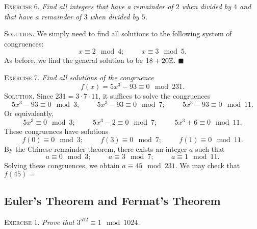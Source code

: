 \documentclass[11pt, leqno]{article}
\newcommand{\done}{\ensuremath{\blacksquare}}
\begin{document}
\textsc{Exercise 6}. \emph{Find all integers that have a remainder of $2$ when divided by $4$ and that have a remainder of $3$ when divided by $5$.}

\textsc{Solution}. We simply need to find all solutions to the following system of congruences: 
\begin{displaymath}
x\equiv 2 \mod 4; \hspace{1cm} x\equiv 3 \mod 5.
\end{displaymath}
As before, we find the general solution to be $18+20\mathbb{Z}$. \done

\textsc{Exercise 7}. \emph{Find all solutions of the congruence 
\begin{displaymath}
f(x) = 5x^3-93 \equiv 0 \mod 231.
\end{displaymath}}\textsc{Solution}. Since $231 = 3\cdot 7\cdot 11$, it suffices to solve the congruences 
\begin{displaymath}
5x^3-93 \equiv 0 \mod 3; \hspace{1cm} 5x^3-93 \equiv 0 \mod 7; \hspace{1cm} 5x^3-93 \equiv 0 \mod 11.
\end{displaymath}Or equivalently,
\begin{displaymath}
5x^3\equiv 0 \mod 3; \hspace{1cm} 5x^3-2\equiv 0 \mod 7; \hspace{1cm} 5x^3+6 \equiv 0 \mod 11.
\end{displaymath}
These congruences have solutions 
\begin{displaymath}
f(0) \equiv 0 \mod 3; \hspace{1cm} f(3) \equiv 0 \mod 7; \hspace{1cm} f(1) \equiv 0 \mod 11.
\end{displaymath}
By the Chinese remainder theorem, there exists an integer $a$ such that 
\begin{displaymath}
a \equiv 0 \mod 3; \hspace{1cm} a \equiv 3 \mod 7; \hspace{1cm} a \equiv 1 \mod 11.
\end{displaymath}
Solving these congruences, we obtain $a \equiv 45 \mod 231$. We may check that $f(45) = $ 

\subsection{Euler's Theorem and Fermat's Theorem}

\textsc{Exercise 1}. \emph{Prove that $3^{512}\equiv 1 \mod 1024$.}
\end{document}
